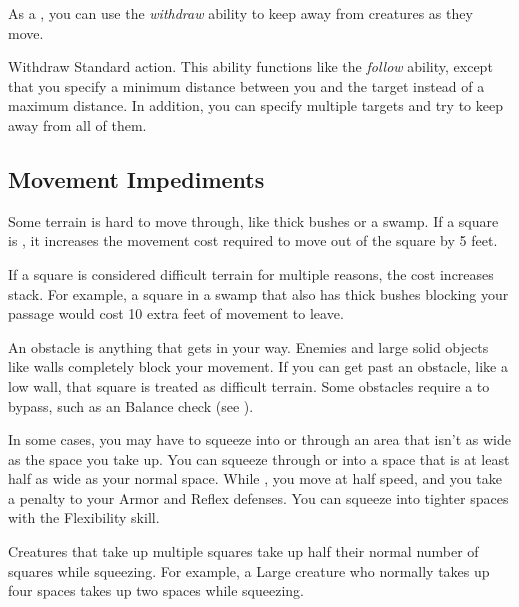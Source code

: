      As a , you can use the \textit{withdraw} ability to keep away from creatures as they move.

    \begin{activeability}{Withdraw}
      \abilityusagetime Standard action.
      \rankline
      This ability functions like the \textit{follow} ability, except that you specify a minimum distance between you and the target instead of a maximum distance.
      In addition, you can specify multiple targets and try to keep away from all of them.
    \end{activeability}

  \subsection{Movement Impediments}

    Some terrain is hard to move through, like thick bushes or a swamp.
    If a square is , it increases the movement cost required to move out of the square by 5 feet.

    If a square is considered difficult terrain for multiple reasons, the cost increases stack.
    For example, a square in a swamp that also has thick bushes blocking your passage would cost 10 extra feet of movement to leave.

    An obstacle is anything that gets in your way. Enemies and large solid objects like walls completely block your movement. If you can get past an obstacle, like a low wall, that square is treated as difficult terrain. Some obstacles require a  to bypass, such as an Balance check (see ).

    In some cases, you may have to squeeze into or through an area that isn't as wide as the space you take up.
    You can squeeze through or into a space that is at least half as wide as your normal space.
    While \squeezing, you move at half speed, and you take a  penalty to your Armor and Reflex defenses.
    You can squeeze into tighter spaces with the Flexibility skill.

    Creatures that take up multiple squares take up half their normal number of squares while squeezing. For example, a Large creature who normally takes up four spaces takes up two spaces while squeezing.

